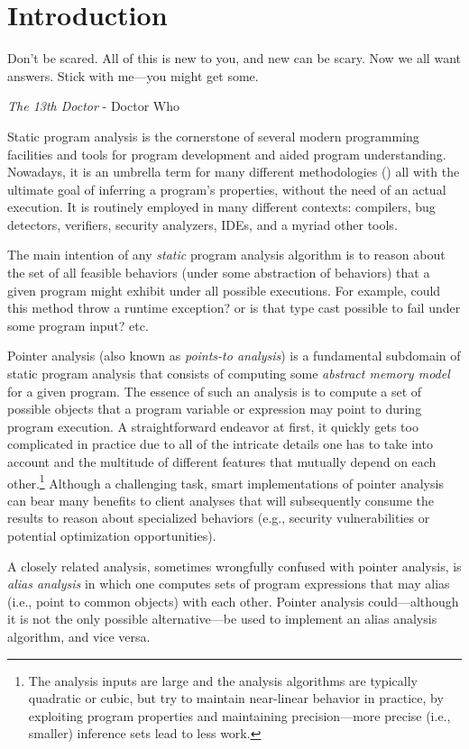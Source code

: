 \chapter{Introduction}
\label{chapter:intro}
\epigraph{Don’t be scared. All of this is new to you, and new can be scary. Now we all want answers. Stick with me---you might get some.}{\textit{The 13th Doctor} - Doctor Who}

Static program analysis is the cornerstone of several modern programming facilities and tools for program development and aided program understanding. Nowadays, it is an umbrella term for many different methodologies (\todo{}) all with the ultimate goal of inferring a program's properties, without the need of an actual execution. It is routinely employed in many different contexts: compilers, bug detectors, verifiers, security analyzers, IDEs, and a myriad other tools.

The main intention of any \emph{static} program analysis algorithm is to reason about the set of all feasible behaviors (under some abstraction of behaviors) that a given program might exhibit under all possible executions. For example, could this method throw a runtime exception? or is that type cast possible to fail under some program input? etc.

Pointer analysis (also known as \emph{points-to analysis}) is a fundamental subdomain of static program analysis that consists of computing some \emph{abstract memory model} for a given program. The essence of such an analysis is to compute a set of possible objects that a program variable or expression may point to during program execution. A straightforward endeavor at first, it quickly gets too complicated in practice due to all of the intricate details one has to take into account and the multitude of different features that mutually depend on each other.\footnote{The analysis inputs are large and the analysis algorithms are typically quadratic or cubic, but try to maintain near-linear behavior in practice, by exploiting program properties and maintaining precision---more precise (i.e., smaller) inference sets lead to less work.} Although a challenging task, smart implementations of pointer analysis can bear many benefits to client analyses that will subsequently consume the results to reason about specialized behaviors (e.g., security vulnerabilities or potential optimization opportunities).

A closely related analysis, sometimes wrongfully confused with pointer analysis, is \emph{alias analysis} in which one computes sets of program expressions that may alias (i.e., point to common objects) with each other. Pointer analysis could---although it is not the only possible alternative---be used to implement an alias analysis algorithm, and vice versa.

